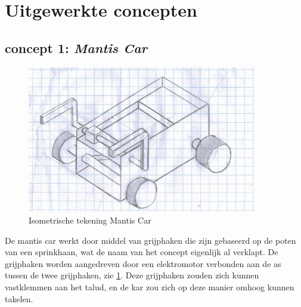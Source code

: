 \section{Uitgewerkte concepten}
\label{se:totaalconcepten}



\subsection{concept 1: \textit{Mantis Car}} 
\label{se:concept_1_mantis_car}

\begin{figure}[H]
    \centering
    \includegraphics[width = 100mm]{04_idee_ontwikkeling/deeloplossing_mantis.JPG}
    \caption{Isometrische tekening Mantis Car}
    \label{fig:deeloplossing_mantis}
\end{figure}

De mantis car werkt door middel van grijphaken die zijn gebaseerd op de poten van een sprinkhaan, wat de naam van het concept eigenlijk al verklapt. De grijphaken worden aangedreven door een elektromotor verbonden aan de as tussen de twee grijphaken, zie \cref{fig:deeloplossing_mantis}. Deze grijphaken zouden zich kunnen vastklemmen aan het talud, en de kar zou zich op deze manier omhoog kunnen takelen.\\

